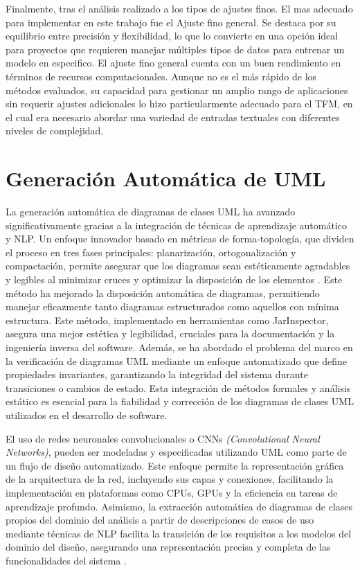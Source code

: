 Finalmente, tras el análisis realizado a los tipos de ajustes finos. El mas adecuado para implementar en este trabajo fue el Ajuste fino general. Se destaca por su equilibrio entre precisión y flexibilidad, lo que lo convierte en una opción ideal para proyectos que requieren manejar múltiples tipos de datos para entrenar un modelo en especifico. El ajuste fino general cuenta con un buen rendimiento en términos de recursos computacionales. Aunque no es el más rápido de los métodos evaluados, su capacidad para gestionar un amplio rango de aplicaciones sin requerir ajustes adicionales lo hizo particularmente adecuado para el TFM, en el cual era necesario abordar una variedad de entradas textuales con diferentes niveles de complejidad.

\section{Generación Automática de UML}

La generación automática de diagramas de clases UML ha avanzado significativamente gracias a la integración de técnicas de aprendizaje automático y NLP. Un enfoque innovador basado en métricas de forma-topología, que dividen el proceso en tres fases principales: planarización, ortogonalización y compactación, permite asegurar que los diagramas sean estéticamente agradables y legibles al minimizar cruces y optimizar la disposición de los elementos \cite{Eiglsperger2003}. Este método ha mejorado la disposición automática de diagramas, permitiendo manejar eficazmente tanto diagramas estructurados como aquellos con mínima estructura. Este método, implementado en herramientas como JarInspector, asegura una mejor estética y legibilidad, cruciales para la documentación y la ingeniería inversa del software. Además, se ha abordado el problema del marco en la verificación de diagramas UML mediante un enfoque automatizado que define propiedades invariantes, garantizando la integridad del sistema durante transiciones o cambios de estado. Esta integración de métodos formales y análisis estático es esencial para la fiabilidad y corrección de los diagramas de clases UML utilizados en el desarrollo de software.


El uso de redes neuronales convolucionales o CNNs \textit{(Convolutional Neural Networks)},  pueden ser modeladas y especificadas utilizando UML como parte de un flujo de diseño automatizado. Este enfoque \cite{Suarez2023} permite la representación gráfica de la arquitectura de la red, incluyendo sus capas y conexiones, facilitando la implementación en plataformas como CPUs, GPUs y la eficiencia en tareas de aprendizaje profundo. Asimismo, la extracción automática de diagramas de clases propios del dominio del análisis a partir de descripciones de casos de uso mediante técnicas de NLP facilita la transición de los requisitos a los modelos del dominio del diseño, asegurando una representación precisa y completa de las funcionalidades del sistema \cite{Gosala2021}.

